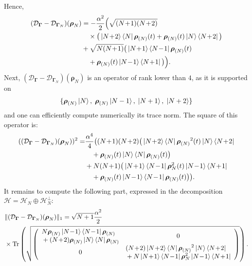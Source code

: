 \documentclass[a4paper,onecolumn,amsmath,amssymb,amsfonts,accepted=2026-03-06]{quantumarticle}
\newcommand{\xH}{\mathcal{H}}
\newcommand{\xtr}[1]{\operatorname{Tr}\left(#1 \right)}
\newcommand{\cD}{\mathcal D}
\newcommand{\LL}{{\mathbf{\Gamma}}}
\newcommand{\rN}{{\boldsymbol{\rho}_{(N)}}}
\begin{document}
Hence, 
\begin{align}
    \notag (\cD_\LL-\cD_{\LL_N})(\boldsymbol{\rho}_N)&=  -\frac{\alpha^2}{2}  \Big( \sqrt{(N\!+\!1)(N\!+\!2)} \notag\\
    &\quad\times \big( \ket{N\!+\!2}\bra{N} \rN(t) + \rN(t) \ket{N}\bra{N\!+\!2} \big)  \\
    & + \sqrt{N(N\!+\!1)} \big( \ket{N\!+\!1}\bra{N\!-\!1} \rN(t) \notag\\
    &\quad + \rN(t) \ket{N\!-\!1}\bra{N\!+\!1} \big) \Big).
\end{align}
Next, $(\cD_\LL-\cD_{\LL_N})(\boldsymbol{\rho}_N)$ is an operator of rank lower than $4$, as it is supported on
\[
\{ \rN \ket{N},\; \rN \ket{N-1},\; \ket{N+1},\;\ket{N+2}\}
\]
and one can efficiently compute numerically its trace norm.
The square of this operator is:
\begin{align}
    \notag ((\cD_\LL-\cD_{\LL_N})(\boldsymbol{\rho}_N))^2=&  \frac{\alpha^4}{4}  \big((N\!+\!1)(N\!+\!2) \big( \ket{N\!+\!2}\bra{N} \rN^2(t)\ket{N}\bra{N\!+\!2} \notag\\
    &\quad + \rN(t)\ket{N}\bra{N}\rN(t)\big)\\
    &+ N(N\!+\!1) \big( \ket{N\!+\!1}\bra{N\!-\!1} \boldsymbol{\rho}^2_N(t)\ket{N\!-\!1}\bra{N\!+\!1}\notag\\
    &\quad + \rN(t) \ket{N\!-\!1}\bra{N\!-\!1} \rN(t)\big)\big).
\end{align}
It remains to compute the following part, expressed in the decomposition $\xH= \xH_N \oplus \xH_N^\perp$:
\begin{align}
    \notag &\|(\cD_\LL-\cD_{\LL_N})(\boldsymbol{\rho}_N)\|_1 = \sqrt{N+1}\frac{\alpha^2}{2} \\
    &\times \xtr{\sqrt{ \left(
        \begin{array}{cc}
            \begin{aligned}
                &N\rN \ket{N\!-\!1}\bra{N\!-\!1} \rN\\
                & + (N\!+\!2) \rN\ket{N}\bra{N}\rN
            \end{aligned}
            & 0 \\
        0
        &\begin{aligned}
            &(N\!+\!2) \ket{N\!+\!2}\bra{N} \rN^2\ket{N}\bra{N\!+\!2}\\
            & + N \ket{N\!+\!1}\bra{N\!-\!1} \boldsymbol{\rho}^2_N\ket{N\!-\!1}\bra{N\!+\!1}
        \end{aligned}
        \end{array} \right)}
    }.
\end{align}
\end{document}
